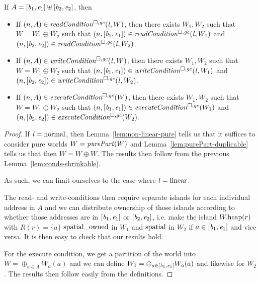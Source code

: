 \documentclass[a4paper]{article}
\begin{document}
\begin{lemma}
  \label{lem:conds-splittable}
  If $A = [\mathit{b}_1,\mathit{e}_1] \uplus [\mathit{b}_2,\mathit{e}_2]$, then
  \begin{itemize}
  \item If $\npair{A} \in \readCond{\lin,W}$, then there exists $W_1, W_2$ such that $W = W_1\oplus W_2$ such that $\npair{[\baddr_1,\eaddr_1]} \in \readCond{\lin,W_1}$ and $\npair{[\baddr_2,\eaddr_2]} \in \readCond{\lin,W_2}$.
  \item If $\npair{A} \in \writeCond{\lin,W}$, then there exists $W_1, W_2$ such that $W = W_1\oplus W_2$ such that $\npair{[\baddr_1,\eaddr_1]} \in \writeCond{\lin,W_1}$ and $\npair{[\baddr_2,\eaddr_2]} \in \writeCond{\lin,W_2}$.
  \item If $\npair{A} \in \execCond{W}$, then there exists $W_1, W_2$ such that $W = W_1\oplus W_2$ such that $\npair{[\baddr_1,\eaddr_1]} \in \execCond{W_1}$ and $\npair{[\baddr_2,\eaddr_2]} \in \execCond{W_2}$.
  \end{itemize}
\end{lemma}
\begin{proof}
  If $\mathit{l} = \mathrm{normal}$, then Lemma~\ref{lem:non-linear-pure} tells us that it suffices to consider pure worlds $W = \purePart{W}$ and Lemma~\ref{lem:purePart-duplicable} tells us that then $W = W \oplus W$.
  The results then follow from the previous Lemma~\ref{lem:conds-shrinkable}.
  
  As such, we can limit ourselves to the case where $\mathit{l} = \mathrm{linear}$.

  The read- and write-conditions then require separate islands for each individual address in $A$ and we can distribute ownership of those islands according to whether those addresses are in $[\mathit{b}_1,\mathit{e}_1]$ or $[\mathit{b}_2,\mathit{e}_2]$, i.e. make the island $W.\mathrm{heap}(r)$ with $R(r) = \{a\}$ $\mathrm{spatial\_owned}$ in $W_1$ and $\mathrm{spatial}$ in $W_2$ if $a \in [\mathit{b}_1,\mathit{e}_1]$ and vice versa.
  It is then easy to check that our results hold.

  For the execute condition, we get a partition of the world into $W = \oplus_{a \in A} W_a(a)$ and we can define $W_1 = \oplus_{a\in[\mathit{b}_1,\mathit{e}_1]} W_a(a)$ and likewise for $W_2$.
  The results then follow easily from the definitions.
\end{proof}
\end{document}
